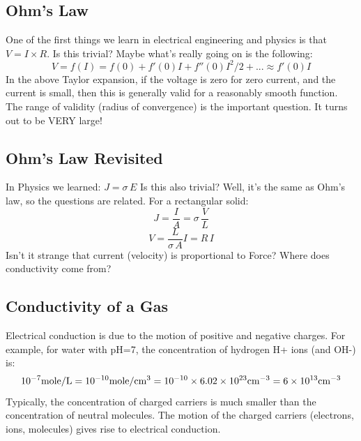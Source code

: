 \subsection{Ohm’s Law}
One of the first things we learn in electrical engineering and physics is that  $V = I \times R$.
Is this trivial? Maybe what’s really going on is the following:
    \begin{equation}
        V = f(I) = f(0) + f'(0)I + f''(0){I^2}/2 + ... \approx f'(0)I
    \end{equation}
In the above Taylor expansion, if the voltage is zero for zero current, and the current is small, then this is generally valid for a reasonably smooth function.   The range of validity (radius of convergence) is the important question. It turns out to be VERY large!
\subsection{Ohm’s Law Revisited}
 In Physics we learned:  $J = \sigma \,E$  Is this also trivial? Well, it’s the same as Ohm’s law, so the questions are related. For a rectangular solid:
\begin{equation}
        J = \frac{I}{A} = \sigma \,\frac{V}{L} \end{equation}\begin{equation}  V = \frac{L}{{\sigma \,A}}I = R\,I
\end{equation}
Isn’t it strange that current (velocity) is proportional to Force?  Where does conductivity come from?
\subsection{Conductivity of a Gas}
Electrical conduction is due to the motion of positive and negative charges.   For example, for  water with pH=7, the concentration of hydrogen H+ ions (and OH-) is:
\begin{equation}
{10^{ - 7}}{\rm{mole/L}} = {\rm{1}}{{\rm{0}}^{{\rm{ - 10}}}}{\rm{mole/c}}{{\rm{m}}^{\rm{3}}}
= {\rm{1}}{{\rm{0}}^{{\rm{ - 10}}}} \times 6.02 \times {10^{23}}{\rm{c}}{{\rm{m}}^{ - 3}}
= 6 \times {10^{13}}{\rm{c}}{{\rm{m}}^{ - 3}}
\end{equation}
Typically, the concentration of charged carriers is much smaller than the concentration of neutral molecules.   The motion of the charged carriers (electrons, ions, molecules) gives rise to electrical conduction.
